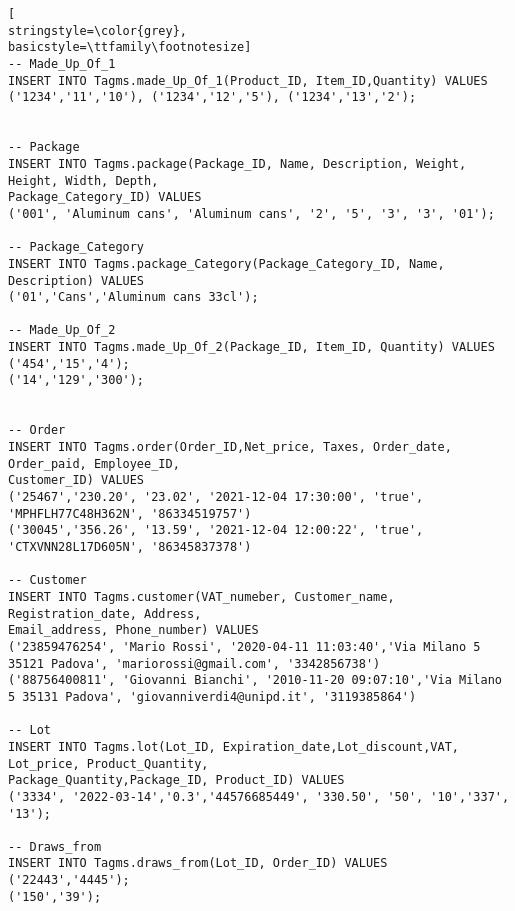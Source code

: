 \begin{lstlisting}[
stringstyle=\color{grey},
basicstyle=\ttfamily\footnotesize]
-- Made_Up_Of_1
INSERT INTO Tagms.made_Up_Of_1(Product_ID, Item_ID,Quantity) VALUES
('1234','11','10'), ('1234','12','5'), ('1234','13','2');


-- Package
INSERT INTO Tagms.package(Package_ID, Name, Description, Weight, Height, Width, Depth, 
Package_Category_ID) VALUES
('001', 'Aluminum cans', 'Aluminum cans', '2', '5', '3', '3', '01');

-- Package_Category
INSERT INTO Tagms.package_Category(Package_Category_ID, Name, Description) VALUES 
('01','Cans','Aluminum cans 33cl');

-- Made_Up_Of_2
INSERT INTO Tagms.made_Up_Of_2(Package_ID, Item_ID, Quantity) VALUES
('454','15','4');
('14','129','300');


-- Order
INSERT INTO Tagms.order(Order_ID,Net_price, Taxes, Order_date, Order_paid, Employee_ID, 
Customer_ID) VALUES 
('25467','230.20', '23.02', '2021-12-04 17:30:00', 'true', 'MPHFLH77C48H362N', '86334519757')
('30045','356.26', '13.59', '2021-12-04 12:00:22', 'true', 'CTXVNN28L17D605N', '86345837378')

-- Customer
INSERT INTO Tagms.customer(VAT_numeber, Customer_name, Registration_date, Address, 
Email_address, Phone_number) VALUES
('23859476254', 'Mario Rossi', '2020-04-11 11:03:40','Via Milano 5 35121 Padova', 'mariorossi@gmail.com', '3342856738')
('88756400811', 'Giovanni Bianchi', '2010-11-20 09:07:10','Via Milano 5 35131 Padova', 'giovanniverdi4@unipd.it', '3119385864')

-- Lot
INSERT INTO Tagms.lot(Lot_ID, Expiration_date,Lot_discount,VAT, Lot_price, Product_Quantity, 
Package_Quantity,Package_ID, Product_ID) VALUES 
('3334', '2022-03-14','0.3','44576685449', '330.50', '50', '10','337', '13');

-- Draws_from
INSERT INTO Tagms.draws_from(Lot_ID, Order_ID) VALUES 
('22443','4445');
('150','39');

\end{lstlisting}